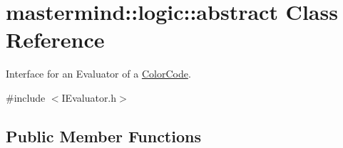 \hypertarget{classmastermind_1_1logic_1_1abstract}{}\section{mastermind\+:\+:logic\+:\+:abstract Class Reference}
\label{classmastermind_1_1logic_1_1abstract}


Interface for an Evaluator of a \hyperlink{classmastermind_1_1logic_1_1_color_code}{Color\+Code}.  




{\ttfamily \#include $<$I\+Evaluator.\+h$>$}

\subsection*{Public Member Functions}
